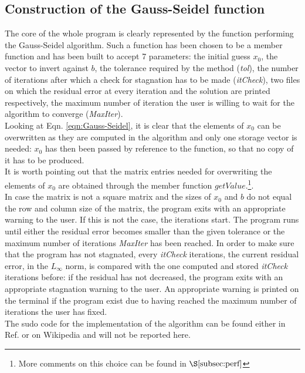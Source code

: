 \documentclass[11pt]{article}
\theoremstyle{theorem}
\theoremstyle{definition}
\begin{document}
\subsection{Construction of the Gauss-Seidel function}
The core of the whole program is clearly represented by the function performing the Gauss-Seidel algorithm. Such a function has been chosen to be a member function and has been built to accept 7 parameters: the initial guess $x_0$, the vector to invert against $b$, the tolerance required by the method (\emph{tol}), the number of iterations after which a check for stagnation has to be made (\emph{itCheck}), two files on which the residual error at every iteration and the solution are printed respectively, the maximum number of iteration the user is willing to wait for the algorithm to converge (\emph{MaxIter}).\\
Looking at Eqn. \eqref{eqn:Gauss-Seidel}, it is clear that the elements of $x_0$ can be overwritten as they are computed in the algorithm and only one storage vector is needed: $x_0$ has then been passed by reference to the function, so that no copy of it has to be produced.\\
It is worth pointing out that the matrix entries needed for overwriting the elements of $x_0$ are obtained through the member function $getValue$.\footnote{More comments on this choice can be found in $\S\ref{subsec:perf}$}.\\  
In case the matrix is not a square matrix and the sizes of $x_0$ and $b$ do not equal the row and column size of the matrix, the program exits with an appropriate warning to the user. If this is not the case, the iterations start. The program runs until either the residual error becomes smaller than the given tolerance or the maximum number of iterations \emph{MaxIter} has been reached. In order to make sure that the program has not stagnated, every \emph{itCheck} iterations, the current residual error, in the $L_\infty$ norm, is compared with the one computed and stored \emph{itCheck} iterations before: if the residual has not decreased, the program exits with an appropriate stagnation warning to the user. An appropriate warning is printed on the terminal if the program exist due to having reached the maximum number of iterations the user has fixed.\\
The sudo code for the implementation of the algorithm can be found either in Ref.\cite{lec-notes} or on Wikipedia and will not be reported here. 
\end{document}

